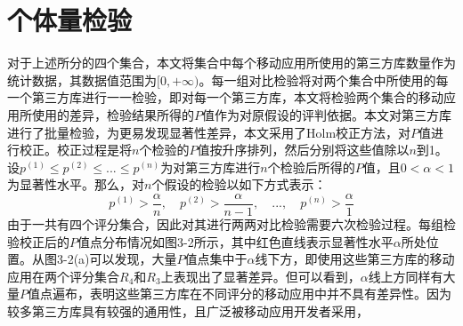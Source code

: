 \section{个体量检验}
对于上述所分的四个集合，本文将集合中每个移动应用所使用的第三方库数量作为统计数据，其数据值范围为$[0, +\infty)$。每一组对比检验将对两个集合中所使用的每一个第三方库进行一一检验，即对每一个第三方库，本文将检验两个集合的移动应用所使用的差异，检验结果所得的$P$值作为对原假设的评判依据。本文对第三方库进行了批量检验，为更易发现显著性差异，本文采用了Holm校正方法\cite{holm1979simple}，对$P$值进行校正。校正过程是将$n$个检验的$P$值按升序排列，然后分别将这些值除以$n$到1。设$p^{(1)} \leqslant p^{(2)} \leqslant ... \leqslant p^{(n)}$为对第三方库进行$n$个检验后所得的$P$值，且$0 < \alpha < 1$为显著性水平。那么，对$n$个假设的检验以如下方式表示：
\begin{equation}
p^{(1)} > \frac{\alpha}{n}, \quad p^{(2)} > \frac{\alpha}{n-1}, \quad ... , \quad p^{(n)} > \frac{\alpha}{1}
\end{equation}
由于一共有四个评分集合，因此对其进行两两对比检验需要六次检验过程。每组检验校正后的$P$值点分布情况如图3-2所示，其中红色直线表示显著性水平$\alpha$所处位置。从图3-2(a)可以发现，大量$P$值点集中于$\alpha$线下方，即使用这些第三方库的移动应用在两个评分集合$R_4$和$R_3$上表现出了显著差异。但可以看到，$\alpha$线上方同样有大量$P$值点遍布，表明这些第三方库在不同评分的移动应用中并不具有差异性。因为较多第三方库具有较强的通用性，且广泛被移动应用开发者采用，
